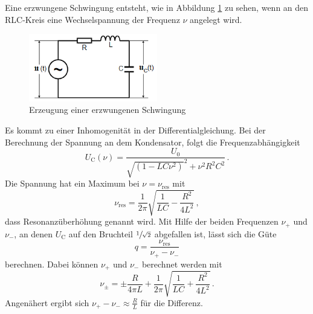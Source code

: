 Eine erzwungene Schwingung entsteht, wie in Abbildung \ref{fig:erzw} zu sehen, wenn an den RLC-Kreis eine Wechselspannung der Frequenz $\nu$ angelegt wird.
\begin{figure}
    \centering
    \caption{Erzeugung einer erzwungenen Schwingung \cite{}} 
    \label{fig:erzw}
    \includegraphics[width = 0.5\textwidth]{pics/Erzwungen.png}
\end{figure}
Es kommt zu einer Inhomogenität in der 
Differentialgleichung. Bei der Berechnung der Spannung an dem Kondensator, folgt die Frequenzabhängigkeit
\begin{equation}
    U_\text{C}(\nu)= \frac{U_0}{\sqrt{\left(1-LC\nu^2\right)}^2 + \nu^2 R^2 C^2} \, .
    \label{eqn:frqnzabhängi}
\end{equation}
Die Spannung hat ein Maximum bei $\nu=\nu_\text{res}$ mit 
\begin{equation}
    \nu_\text{res}= \frac{1}{2 \pi} \sqrt{\frac{1}{L C} - \frac{R^2}{4 L^2}} \, ,
    \label{eqn:omgres}
\end{equation}
dass Resonanzüberhöhung genannt wird. Mit Hilfe der beiden Frequenzen $\nu_+$ und $\nu_-$, an denen $U_\text{C}$ auf den Bruchteil $\sfrac{1}{\sqrt{2}}$
abgefallen ist, lässt sich die Güte 
\begin{equation}
    q=\frac{\nu_\text{res}}{\nu_+ - \nu_-}
    \label{eqn:güte}
\end{equation}
berechnen. Dabei können $\nu_+$ und $\nu_-$ berechnet werden mit
\begin{equation}
    \nu_\pm= \pm \frac{R}{4 \pi L} + \frac{1}{2\pi} \sqrt{\frac{1}{L C} + \frac{R^2}{4 L^2}} \, .
    \label{eqn:omgapm}
\end{equation}
Angenähert ergibt sich $\nu_+ - \nu_- \approx \frac{R}{L}$ für die Differenz.